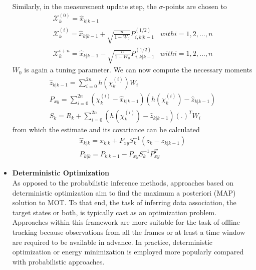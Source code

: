 \begin{itemize}
                                Similarly, in the measurement update step, the $\sigma$-points are chosen to 
                                \begin{align}
                                    \mathcal{X}_k^{(0)} = \hat{x}_{k|k-1} \\
                                    \mathcal{X}_k^{(i)} = \hat{x}_{k|k-1} + \sqrt{\frac{n}{1-W_0}} P_{i,k|k-1}^{(1/2)} & with i = 1,2,...,n \\
                                    \mathcal{X}_k^{i+n} = \hat{x}_{k|k-1} - \sqrt{\frac{n}{1-W_0}} P_{i,k|k-1}^{(1/2)} & with i = 1,2,...,n
                                \end{align}
                                \emph{$W_0$} is again a tuning parameter. We can now compute the necessary moments
                                \begin{align}
                                    \hat{z}_{k|k-1} = \displaystyle\sum_{i=0}^{2n} h(\chi_k^{(i)}) W_i \\ 
                                    P_{xy} = \displaystyle\sum_{i=0}^{2n} (\chi_k^{(i)} - \hat{x}_{k|k-1}) (h(\chi_k^{(i)}) - \hat{z}_{k|k-1}) \\ 
                                    S_k = R_k + \displaystyle\sum_{i=0}^{2n} (h(\chi_k^{(i)}) - \hat{z}_{k|k-1}) (.)^T W_i
                                \end{align}
                                from which the estimate and its covariance can be calculated \\ 
                                \begin{align}
                                    \hat{x}_{k|k} = \hat{x}_{k|k} + P_{xy} S_k^{-1} (z_k - \hat{z}_{k|k-1}) \\ 
                                    P_{k|k} = P_{k|k-1} - P_{xy} S_k^{-1} P_{xy}^T
                                \end{align}
                            
            \item \textbf{Deterministic Optimization} \\ 
                \vspace{3mm}
                As opposed to the probabilistic inference methods, approaches based on deterministic optimization aim to find the maximum a posteriori (MAP) solution to MOT. To that end, the task of inferring data association, the target states or both, 
                is typically cast as an optimization problem. Approaches within this framework are more suitable for the task of offline tracking because observations from all the frames or at least a time window are required to be available in advance. 
                In practice, deterministic optimization or energy minimization is employed more popularly compared with probabilistic approaches.
        \end{itemize}


